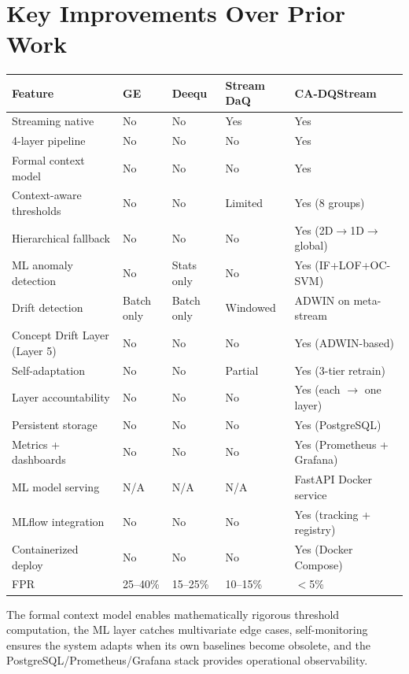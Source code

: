 \section{Key Improvements Over Prior Work}

\begin{longtable}{|m{3.5cm}|m{2.5cm}|m{2.5cm}|m{2.5cm}|m{4cm}|}
\hline
\textbf{Feature} & \textbf{GE} & \textbf{Deequ} & \textbf{Stream DaQ} & \textbf{CA-DQStream} \\ \hline
Streaming native & No & No & Yes & Yes \\ \hline
4-layer pipeline & No & No & No & Yes \\ \hline
Formal context model & No & No & No & Yes \\ \hline
Context-aware thresholds & No & No & Limited & Yes (8 groups) \\ \hline
Hierarchical fallback & No & No & No & Yes (2D$\to$1D$\to$global) \\ \hline
ML anomaly detection & No & Stats only & No & Yes (IF+LOF+OC-SVM) \\ \hline
Drift detection & Batch only & Batch only & Windowed & ADWIN on meta-stream \\ \hline
Concept Drift Layer (Layer 5) & No & No & No & Yes (ADWIN-based) \\ \hline
Self-adaptation & No & No & Partial & Yes (3-tier retrain) \\ \hline
Layer accountability & No & No & No & Yes (each $\to$ one layer) \\ \hline
Persistent storage & No & No & No & Yes (PostgreSQL) \\ \hline
Metrics + dashboards & No & No & No & Yes (Prometheus + Grafana) \\ \hline
ML model serving & N/A & N/A & N/A & FastAPI Docker service \\ \hline
MLflow integration & No & No & No & Yes (tracking + registry) \\ \hline
Containerized deploy & No & No & No & Yes (Docker Compose) \\ \hline
FPR & 25--40\% & 15--25\% & 10--15\% & $<$5\% \\ \hline
\end{longtable}

The formal context model enables mathematically rigorous threshold computation, the ML layer catches multivariate edge cases, self-monitoring ensures the system adapts when its own baselines become obsolete, and the PostgreSQL/Prometheus/Grafana stack provides operational observability.

